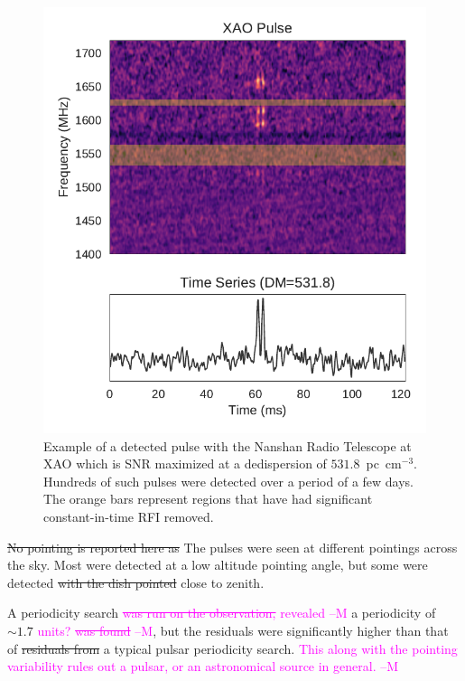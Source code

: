 \documentclass[a4paper,fleqn,usenatbib]{mnras}
\newcommand{\cM}[1]{\textcolor{magenta}{ #1 --M}}
\begin{document}
\begin{figure}
    \includegraphics[width=1.0\linewidth]{figures/XAO_pulse_dynamic.pdf}
    \caption{Example of a detected pulse with the Nanshan Radio Telescope at XAO
    which is SNR maximized at a dedispersion of $531.8$~pc~cm$^{-3}$. Hundreds
    of such pulses were detected over a period of a few days. The orange bars
    represent regions that have had significant constant-in-time RFI removed.
    }
    \label{fig:xao_dynamic}
\end{figure}

\sout{No pointing is reported here as }The pulses were seen at different pointings
across the sky. Most were detected at a low altitude pointing angle, but some
were detected \sout{with the dish pointed }close to zenith.

A periodicity search \cM{\sout{was run on the observation,} revealed} a periodicity of $\sim 1.7$ \cM{units? \sout{was
found}}, but the residuals were significantly higher than that of \sout{residuals from} a
typical pulsar periodicity search. \cM{This along with the pointing variability
rules out a pulsar, or an astronomical source in general.}
\end{document}
